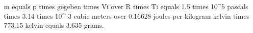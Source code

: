 m equals p times gegeben times Vi over R times Ti equals 1.5 times 10^5 pascals times 3.14 times 10^-3 cubic meters over 0.16628 joules per kilogram-kelvin times 773.15 kelvin equals 3.635 grams.